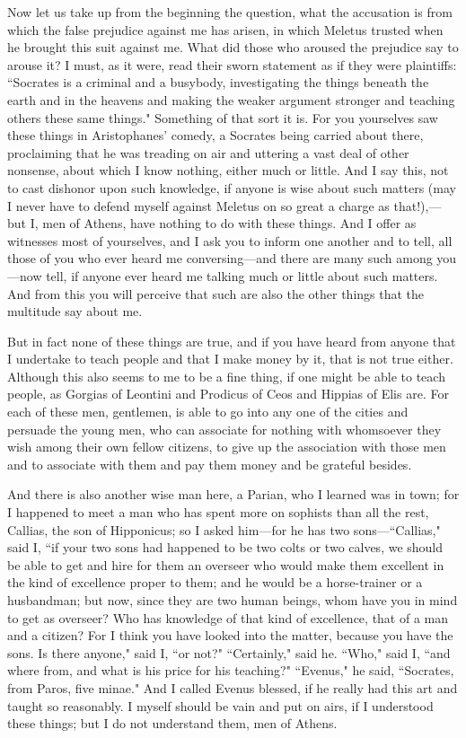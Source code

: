\documentclass[letterpaper,12pt]{article}
\newcommand{\stephpag}[1]{\marginnote{\small\itshape\fontfamily{ppl}\selectfont #1}}
\begin{document}
Now let us take up from the beginning the question, what the accusation is from which the false prejudice against me has arisen, in which \stephpag{b} Meletus trusted when he brought this suit against me. What did those who aroused the prejudice say to arouse it? I must, as it were, read their sworn statement as if they were plaintiffs: ``Socrates is a criminal and a busybody, investigating the things beneath the earth and in the heavens and making the weaker argument stronger and \stephpag{c} teaching others these same things." Something of that sort it is. For you yourselves saw these things in Aristophanes' comedy, a Socrates being carried about there, proclaiming that he was treading on air and uttering a vast deal of other nonsense, about which I know nothing, either much or little. And I say this, not to cast dishonor upon such knowledge, if anyone is wise about such matters (may I never have to defend myself against Meletus on so great a charge as that!),---but I, men of Athens, have nothing to do with these things. \stephpag{d} And I offer as witnesses most of yourselves, and I ask you to inform one another and to tell, all those of you who ever heard me conversing---and there are many such among you---now tell, if anyone ever heard me talking much or little about such matters. And from this you will perceive that such are also the other things that the multitude say about me.

But in fact none of these things are true, and if you have heard from anyone that I undertake to teach \stephpag{e} people and that I make money by it, that is not true either. Although this also seems to me to be a fine thing, if one might be able to teach people, as Gorgias of Leontini and Prodicus of Ceos and Hippias of Elis are. For each of these men, gentlemen, is able to go into any one of the cities and persuade the young men, who can associate for nothing with whomsoever they wish among their own fellow citizens, \stephpag{20 a} to give up the association with those men and to associate with them and pay them money and be grateful besides.

And there is also another wise man here, a Parian, who I learned was in town; for I happened to meet a man who has spent more on sophists than all the rest, Callias, the son of Hipponicus; so I asked him---for he has two sons---``Callias," said I, ``if your two sons had happened to be two colts or two calves, we should be able to get and hire for them an overseer who would make them \stephpag{b} excellent in the kind of excellence proper to them; and he would be a horse-trainer or a husbandman; but now, since they are two human beings, whom have you in mind to get as overseer? Who has knowledge of that kind of excellence, that of a man and a citizen? For I think you have looked into the matter, because you have the sons. Is there anyone," said I, ``or not?" ``Certainly," said he. ``Who," said I, ``and where from, and what is his price for his teaching?" ``Evenus," he said, ``Socrates, from Paros, five minae." And I called Evenus blessed, \stephpag{c} if he really had this art and taught so reasonably. I myself should be vain and put on airs, if I understood these things; but I do not understand them, men of Athens.
\end{document}
